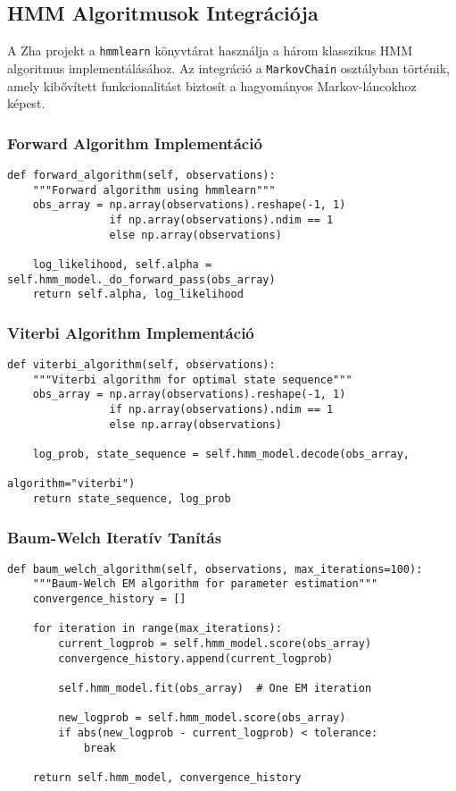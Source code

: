 \subsection{HMM Algoritmusok Integrációja}

A Zha projekt a \texttt{hmmlearn} könyvtárat használja a három klasszikus HMM algoritmus implementálásához. Az integráció a \texttt{MarkovChain} osztályban történik, amely kibővített funkcionalitást biztosít a hagyományos Markov-láncokhoz képest.

\subsubsection{Forward Algorithm Implementáció}

\begin{verbatim}
def forward_algorithm(self, observations):
    """Forward algorithm using hmmlearn"""
    obs_array = np.array(observations).reshape(-1, 1) 
                if np.array(observations).ndim == 1 
                else np.array(observations)
    
    log_likelihood, self.alpha = self.hmm_model._do_forward_pass(obs_array)
    return self.alpha, log_likelihood
\end{verbatim}

\subsubsection{Viterbi Algorithm Implementáció}

\begin{verbatim}
def viterbi_algorithm(self, observations):
    """Viterbi algorithm for optimal state sequence"""
    obs_array = np.array(observations).reshape(-1, 1) 
                if np.array(observations).ndim == 1 
                else np.array(observations)
    
    log_prob, state_sequence = self.hmm_model.decode(obs_array, 
                                                   algorithm="viterbi")
    return state_sequence, log_prob
\end{verbatim}

\subsubsection{Baum-Welch Iteratív Tanítás}

\begin{verbatim}
def baum_welch_algorithm(self, observations, max_iterations=100):
    """Baum-Welch EM algorithm for parameter estimation"""
    convergence_history = []
    
    for iteration in range(max_iterations):
        current_logprob = self.hmm_model.score(obs_array)
        convergence_history.append(current_logprob)
        
        self.hmm_model.fit(obs_array)  # One EM iteration
        
        new_logprob = self.hmm_model.score(obs_array)
        if abs(new_logprob - current_logprob) < tolerance:
            break
            
    return self.hmm_model, convergence_history
\end{verbatim}

